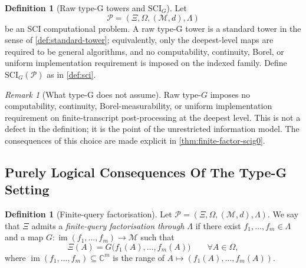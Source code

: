 \documentclass{lmcs} %
\theoremstyle{plain}
\theoremstyle{plain}
\theoremstyle{definition}
\newtheorem{definition}[theorem]{Definition}
\theoremstyle{remark}
\newtheorem{remark}[theorem]{Remark}
\theoremstyle{definition}
\theoremstyle{remark}
\numberwithin{equation}{section}
\newcommand{\C}{\mathbb{C}}
\newcommand{\SCIG}{\mathrm{SCI}_G}
\begin{document}
\begin{definition}[Raw type-G towers and \(\SCIG\)]\label{def:scig}
Let
\[
        \mathcal P=(\Xi,\Omega,(\mathcal M,d),\Lambda)
\]
be an SCI computational problem. A raw type-G tower is a standard tower in the sense
of \cref{def:standard-tower}; equivalently, only the deepest-level maps are
required to be general algorithms, and no computability, continuity, Borel, or uniform
implementation requirement is imposed on the indexed family. Define \(\SCIG(\mathcal P)\) as
in \cref{def:sci}.
\end{definition}

\begin{remark}[What type-G does not assume]\label{rem:typeg-not}
Raw type-\(G\) imposes no computability, continuity, Borel-measurability, or uniform implementation requirement on finite-transcript post-processing at the deepest level. This is not a defect in the definition; it is the point of the unrestricted information model. The consequences of this choice are made explicit in \cref{thm:finite-factor-scig0}.
\end{remark}

\subsection{Purely Logical Consequences Of The Type-G Setting}

\begin{definition}[Finite-query factorisation]\label{def:finite-factor}
Let $\mathcal{P}=(\Xi,\Omega,(\mathcal{M},d),\Lambda)$.
We say that $\Xi$ admits a \textit{finite-query factorisation through $\Lambda$} if there exist
$f_1,\dots,f_m\in\Lambda$ and a map $G: \operatorname{im}(f_1,\dots,f_m)\to \mathcal{M}$ such that
\[
\Xi(A)=G\bigl(f_1(A),\dots,f_m(A)\bigr)\qquad\forall A\in\Omega,
\]
where $\operatorname{im}(f_1,\dots,f_m)\subseteq \C^m$ is the range of $A\mapsto (f_1(A),\dots,f_m(A))$.
\end{definition}
\end{document}

